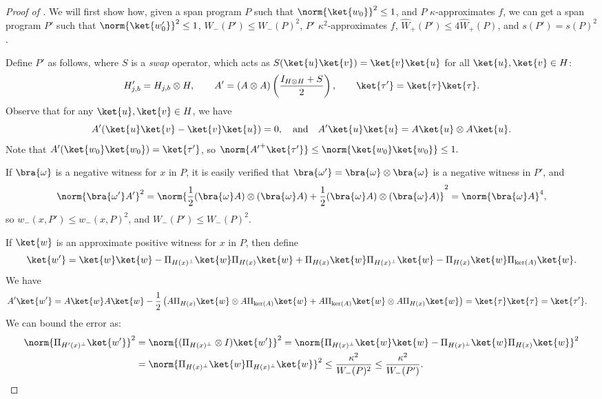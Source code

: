 \documentclass{toc}
\begin{document}
\begin{proof}[Proof of ]
We will first show how, given a span program $P$ such that $\norm{\ket{w_0}}^2\leq 1$,  
and $P$ $\kappa$-approximates $f$, we can get a  span program $P'$ such that $\norm{\ket{w_0'}}^2\leq 1$, $W_-(P')\leq W_-(P)^2$, $P'$ $\kappa^2$-approximates $f$, $\widehat{W}_+(P')\leq 4\widehat{W}_+(P)$, and $s(P')=s(P)^2$.

Define $P'$ as follows, where $S$ is a \emph{swap} operator, which acts as $S(\ket{u}\ket{v})=\ket{v}\ket{u}$ for all $\ket{u},\ket{v}\in H$:
$$H_{j,b}'=H_{j,b}\otimes H,\qquad
A' = (A\otimes A)\left(\frac{I_{H\otimes H}+S}{2}\right),\qquad
\ket{\tau'}=\ket{\tau}\ket{\tau}.$$
Observe that for any $\ket{u},\ket{v}\in H$, we have
$$A'(\ket{u}\ket{v}-\ket{v}\ket{u})=0,\quad\mbox{and}\quad
A'\ket{u}\ket{u}=A\ket{u}\otimes A\ket{u}.$$
Note that $A'(\ket{w_0}\ket{w_0})=\ket{\tau'}$, so 
$\norm{{A'}^+\ket{\tau'}}\leq \norm{\ket{w_0}\ket{w_0}}\leq 1.$


If $\bra{\omega}$ is a negative witness for $x$ in $P$, it is easily verified that $\bra{\omega'}=\bra{\omega}\otimes\bra{\omega}$ is a negative witness in $P'$, 
and
$$\norm{\bra{\omega'}A'}^2 = \norm{\frac{1}{2}(\bra{\omega} A)\otimes (\bra{\omega}A)+\frac{1}{2}(\bra{\omega} A)\otimes (\bra{\omega}A)}^2 = \norm{\bra{\omega}A}^4,$$
so 
$w_-(x,P')\leq w_-(x,P)^2$, and $W_-(P')\leq W_-(P)^2$. 


If $\ket{w}$ is an approximate positive witness for $x$ in $P$, then define
$$\ket{w'}=\ket{w}\ket{w} - \Pi_{H(x)^\bot}\ket{w}\Pi_{H(x)}\ket{w}+\Pi_{H(x)}\ket{w}\Pi_{H(x)^\bot}\ket{w}-\Pi_{H(x)}\ket{w}\Pi_{\ker(A)}\ket{w}.$$
We have
\begin{align*}
A'\ket{w'} &= A\ket{w} A\ket{w} - \frac{1}{2}\left(A\Pi_{H(x)}\ket{w}\otimes A\Pi_{\ker(A)}\ket{w}+A\Pi_{\ker(A)}\ket{w}\otimes A\Pi_{H(x)}\ket{w}\right)
= \ket{\tau}\ket{\tau}=\ket{\tau'}.
\end{align*}
We can bound the error as:
\begin{align*}
\norm{\Pi_{H'(x)^\bot}\ket{w'}}^2 &= \norm{(\Pi_{H(x)^\bot}\otimes I)\ket{w'}}^2
= \norm{\Pi_{H(x)^\bot}\ket{w}\ket{w}-\Pi_{H(x)^\bot}\ket{w}\Pi_{H(x)}\ket{w}}^2\\
&= \norm{\Pi_{H(x)^\bot}\ket{w}\Pi_{H(x)^\bot}\ket{w}}^2
\leq \frac{\kappa^2}{W_-(P)^2}\leq \frac{\kappa^2}{W_-(P')}.
\end{align*}


\end{proof}
\end{document}
